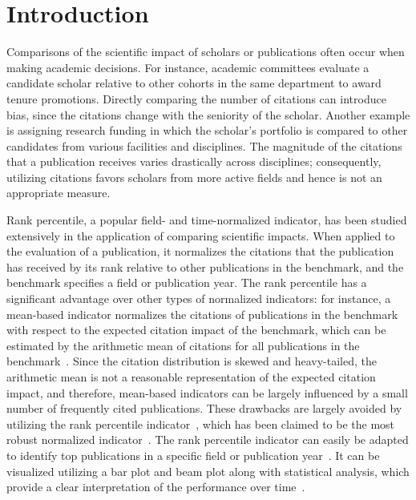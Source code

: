 \section*{Introduction}

Comparisons of the scientific impact of scholars or publications often occur when making academic decisions. For instance, academic committees evaluate a candidate scholar relative to other cohorts in the same department to award tenure promotions. Directly comparing the number of citations can introduce bias, since the citations change with the seniority of the scholar. Another example is assigning research funding in which the scholar’s portfolio is compared to other candidates from various facilities and disciplines. The magnitude of the citations that a publication receives varies drastically across disciplines; consequently, utilizing citations favors scholars from more active fields and hence is not an appropriate measure.

Rank percentile, a popular field- and time-normalized indicator, has been studied extensively in the application of comparing scientific impacts. When applied to the evaluation of a publication, it normalizes the citations that the publication has received by its rank relative to other publications in the benchmark, and the benchmark specifies a field or publication year. The rank percentile has a significant advantage over other types of normalized indicators: for instance, a mean-based indicator normalizes the citations of publications in the benchmark with respect to the expected citation impact of the benchmark, which can be estimated by the arithmetic mean of citations for all publications in the benchmark~\cite{schubert1986relative}. Since the citation distribution is skewed and heavy-tailed, the arithmetic mean is not a reasonable representation of the expected citation impact, and therefore, mean-based indicators can be largely influenced by a small number of frequently cited publications. These drawbacks are largely avoided by utilizing the rank percentile indicator~\cite{bornmann2013use,bornmann2015methods,mingers2015review,bornmann2019well,waltman2019field}, which has been claimed to be the most robust normalized indicator~\cite{hicks2015bibliometrics}. The rank percentile indicator can easily be adapted to identify top publications in a specific field or publication year~\cite{bornmann2014excellent}. It can be visualized utilizing a bar plot and beam plot along with statistical analysis, which provide a clear interpretation of the performance over time~\cite{bornmann2014distributions,bornmann2014evaluate,williams2014substantive,bornmann2018plots,bornmann2020evaluation}.

